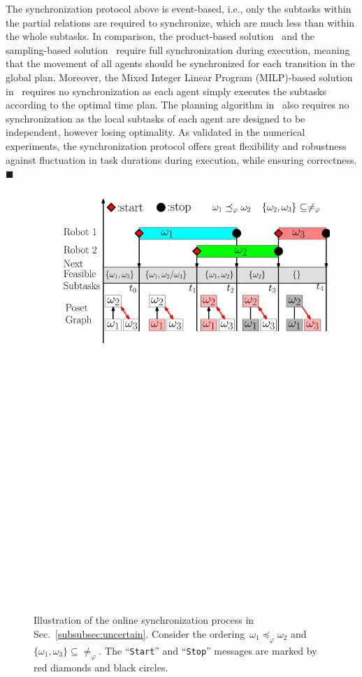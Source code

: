 \begin{remark}\label{remark:syn}
The synchronization protocol above is event-based,
i.e.,  only the subtasks within the partial relations
are required to synchronize,
which are much less than within the whole subtasks.
In comparison, the product-based solution~\citep{baier2008principles}
and the sampling-based solution~\citep{kantaros2020stylus}
require full synchronization during execution,
meaning that the movement of all agents should be synchronized for each
transition in the global plan.
Moreover, the Mixed Integer Linear Program (MILP)-based solution
in~\citep{luo2021temporal, jones2019scratchs}
requires no synchronization as each agent simply executes the subtasks
according to the optimal time plan.
The planning algorithm in~\citep{schillinger2018simultaneous}
also requires no synchronization as the local subtasks of each agent
are designed to be independent, however losing optimality.
As validated in the numerical experiments,
the synchronization protocol offers great flexibility
and robustness against fluctuation in task durations during execution,
while ensuring correctness.
\hfill  $\blacksquare$
\end{remark}


\begin{figure}[t]
	\centering
	\includegraphics[width=0.8\linewidth]{figures/online_adapt3.pdf}
        \caption{
Illustration of the online synchronization process
in Sec.~\ref{subsubsec:uncertain}.
Consider the ordering~$\omega_1 \preceq_{\varphi}\omega_2$
and~$\{\omega_1, \omega_3\}\subseteq\neq_\varphi $.
The ``\texttt{Start}'' and ``\texttt{Stop}'' messages are
marked by red diamonds and black circles.}
\label{fig:online adaption}
\end{figure}



